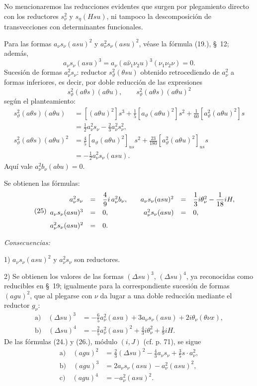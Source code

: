 \documentclass[11pt]{article}
\newcommand{\A}{\Delta}
\begin{document}
No mencionaremos las reducciones evidentes que surgen por plegamiento directo con los reductores $s_\nu^2$ y $s_\eta(Hsu)$, ni tampoco la descomposición de transvecciones con determinantes funcionales.

Para las formas $a_\nu s_\nu(asu)^2$ y $a_\nu^2s_\nu(asu)^2$, véase la fórmula (19.), \S\ 12; además,
\[
 a_\nu s_\nu(asu)^3=a_\nu(a\widehat{\nu}_1\nu_2u)^3(\nu_1\nu_2\nu)=0.
\]
Sucesión de formas $a_\nu^2s_\nu$: reductor $s_\vartheta^2(\theta su)$ obtenido retrocediendo de $a_\nu^2$ a formas inferiores, es decir, por doble reducción de las expresiones
\[
 s_\vartheta^2(a\theta s)(a\theta u),
 \qquad s_\vartheta^2(a\theta s)(a\theta u)^2
\]
según el planteamiento:
\[
\begin{aligned}
s_\vartheta^2(a\theta s)(a\theta u)
&=[(a\theta u)^2]s^3+\frac15[a_\vartheta(a\theta u)^2]s^2+\frac1{60}[a_\vartheta^2(a\theta u)^2]s\\
&=\frac12a_\nu^2s_\nu-\frac23a_\nu^2s_\nu^2,\\
s_\vartheta^2(a\theta s)(a\theta u)^2
&=\frac45[a_\vartheta(a\theta u)^2]_{us}s^2+\frac{23}{180}[a_\vartheta^2(a\theta u)^2]_{us}s\\
&=-\frac12a_\nu^2s_\nu(asu).
\end{aligned}
\]
Aquí vale $a_\nu^2b_\nu(abu)=0$.

Se obtienen las fórmulas:
\[
\tag{25}
\begin{array}{rcl@{\qquad}rcl}
a_\nu^2s_\nu&=&\dfrac49i\,a_\nu^2b_\nu,
& a_\nu s_\nu(asu)^2&=&\dfrac13i\theta_\nu^2-\dfrac1{18}iH,\\[0.7em]
a_\nu s_\nu(asu)^3&=&0,
& a_\nu^2s_\nu(asu)&=&0,\\[0.7em]
a_\nu^2s_\nu(asu)^2&=&0.
\end{array}
\]

\noindent\emph{Consecuencias:}

1) $a_\nu s_\nu(asu)^2$ y $a_\nu^2s_\nu$ son reductores.

2) Se obtienen los valores de las formas $(\A su)^3$, $(\A su)^4$, ya reconocidas como reducibles en \S\ 19; igualmente para la correspondiente sucesión de formas $(agu)^2$, que al plegarse con $\nu$ da lugar a una doble reducción mediante el reductor $g_\nu$:
\[
\tag{26}
\begin{aligned}
\text{a)}\quad (\A su)^3&=-\frac65a_\nu^2(asu)+3a_\nu s_\nu(asu)+2i\theta_\nu(\theta\nu x),\\
\text{b)}\quad (\A su)^4&=-\frac25a_\nu^2(asu)^2+\frac43i\theta_\nu^2+\frac19iH.
\end{aligned}
\]
De las fórmulas (24.) y (26.), módulo $(i,J)$ (cf. p. 71), se sigue
\[
\tag{27}
\begin{aligned}
\text{a)}\quad (agu)^2&=\frac23(\A su)^2-\frac43a_\nu s_\nu+\frac35s\cdot a_\nu^2,\\
\text{b)}\quad (agu)^3&=2a_\nu s_\nu(asu)-a_\nu^2(asu)^2,\\
\text{c)}\quad (agu)^4&=-a_\nu^2(asu)^2.
\end{aligned}
\]
\end{document}

